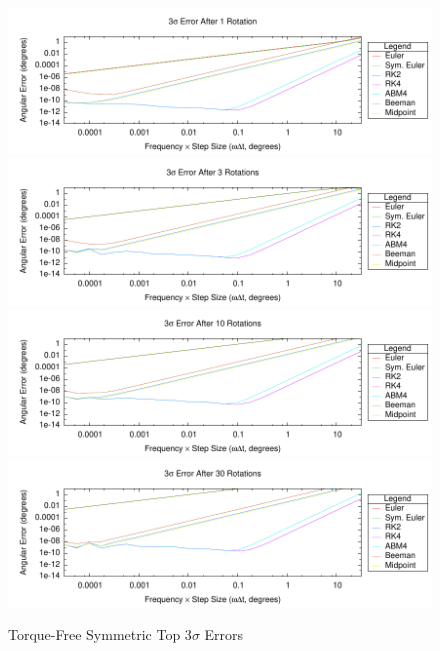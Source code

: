 \begin{description}
\begin{figure}[hbtp]
\centering
\includegraphics{figures/plot_RotationTestTorqueFreeSymTop_revs_1_monte_err}
\vspace{2.0ex}
\includegraphics{figures/plot_RotationTestTorqueFreeSymTop_revs_3_monte_err}
\vspace{2.0ex}
\includegraphics{figures/plot_RotationTestTorqueFreeSymTop_revs_10_monte_err}
\vspace{2.0ex}
\includegraphics{figures/plot_RotationTestTorqueFreeSymTop_revs_30_monte_err}
\caption{Torque-Free Symmetric Top 3$\sigma$ Errors}
\label{fig:ffsymtop_err}
\end{figure} 


\end{description}
